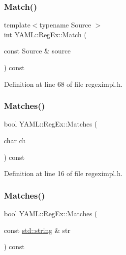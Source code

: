 \subsubsection{\texorpdfstring{Match()}{Match()}\hspace{0.1cm}{\footnotesize\ttfamily [3/3]}}
{\footnotesize\ttfamily template$<$typename Source $>$ \\
int Y\+A\+M\+L\+::\+Reg\+Ex\+::\+Match (\begin{DoxyParamCaption}\item[{const Source \&}]{source }\end{DoxyParamCaption}) const\hspace{0.3cm}{\ttfamily [inline]}}



Definition at line 68 of file regeximpl.\+h.

\mbox{\label{class_y_a_m_l_1_1_reg_ex_a7a09aef4713985c80b4d1a1f17d57feb}} 
\subsubsection{\texorpdfstring{Matches()}{Matches()}\hspace{0.1cm}{\footnotesize\ttfamily [1/4]}}
{\footnotesize\ttfamily bool Y\+A\+M\+L\+::\+Reg\+Ex\+::\+Matches (\begin{DoxyParamCaption}\item[{char}]{ch }\end{DoxyParamCaption}) const\hspace{0.3cm}{\ttfamily [inline]}}



Definition at line 16 of file regeximpl.\+h.

\mbox{\label{class_y_a_m_l_1_1_reg_ex_afd6dd2d8c567bf9fc33cf1a9dd3be895}} 
\subsubsection{\texorpdfstring{Matches()}{Matches()}\hspace{0.1cm}{\footnotesize\ttfamily [2/4]}}
{\footnotesize\ttfamily bool Y\+A\+M\+L\+::\+Reg\+Ex\+::\+Matches (\begin{DoxyParamCaption}\item[{const \mbox{\hyperlink{glad_8h_ac83513893df92266f79a515488701770}{std\+::string}} \&}]{str }\end{DoxyParamCaption}) const\hspace{0.3cm}{\ttfamily [inline]}}



